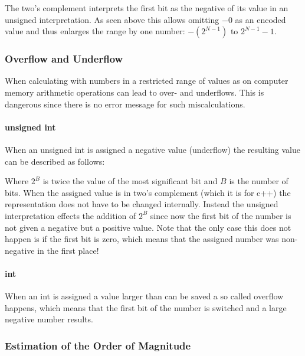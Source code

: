 \documentclass[10pt,a4paper]{scrartcl}
\begin{document}
\begin{multicols*}{2}
The two's complement interprets the first bit as the negative of its value in an unsigned interpretation. As seen above this allows omitting $-0$ as an encoded value and thus enlarges the range by one number: $-(2^{N-1})$ to $2^{N-1}-1$.

\subsubsection{Overflow and Underflow}
\label{sec:OverflowAndUnderflow}

When calculating with numbers in a restricted range of values as on computer memory arithmetic operations can lead to over- and underflows. This is dangerous since there is no error message for such miscalculations.

\paragraph{unsigned int}

When an unsigned int is assigned a negative value (underflow) the resulting value can be described as follows:


Where $2^B$ is twice the value of the most significant bit and $B$ is the number of bits. When the assigned value is in two's complement (which it is for c++) the representation does not have to be changed internally. Instead the unsigned interpretation effects the addition of $2^B$ since now the first bit of the number is not given a negative but a positive value. Note that the only case this does not happen is if the first bit is zero, which means that the assigned number was non-negative in the first place!

\paragraph{int}

When an int is assigned a value larger than can be saved a so called overflow happens, which means that the first bit of the number is switched and a large negative number results.

\subsubsection{Estimation of the Order of Magnitude}
\label{sec:EstimationOfTheOrderOfMagnitude}


\end{multicols*}
\end{document}
